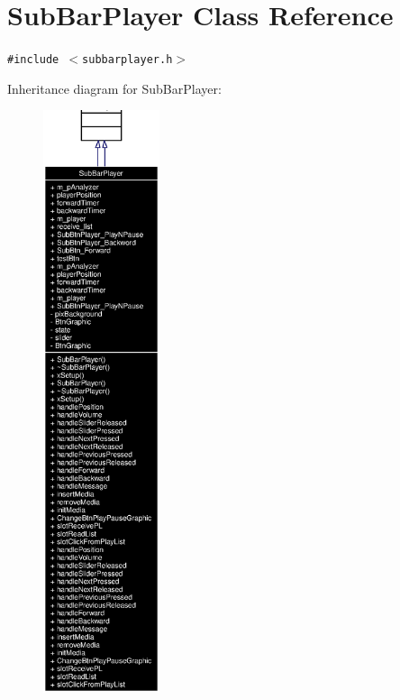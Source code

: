 \section{Sub\-Bar\-Player Class Reference}
\label{classSubBarPlayer}
{\tt \#include $<$subbarplayer.h$>$}

Inheritance diagram for Sub\-Bar\-Player:\begin{figure}[H]
\begin{center}
\leavevmode
\includegraphics[width=97pt]{classSubBarPlayer__inherit__graph}
\end{center}
\end{figure}
